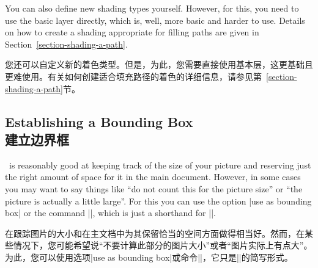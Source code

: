 You can also define new shading types yourself. However, for this, you need to
use the basic layer directly, which is, well, more basic and harder to use.
Details on how to create a shading appropriate for filling paths are given in
Section~\ref{section-shading-a-path}.

您还可以自定义新的着色类型。但是，为此，您需要直接使用基本层，这更基础且更难使用。有关如何创建适合填充路径的着色的详细信息，请参见第~\ref{section-shading-a-path}节。



\subsection{Establishing a Bounding Box\\建立边界框}

\pgfname\ is reasonably good at keeping track of the size of your picture and
reserving just the right amount of space for it in the main document. However,
in some cases you may want to say things like ``do not count this for the
picture size'' or ``the picture is actually a little large''. For this you can
use the option |use as bounding box| or the command |\useasboundingbox|, which
is just a shorthand for ||.

\pgfname 在跟踪图片的大小和在主文档中为其保留恰当的空间方面做得相当好。然而，在某些情况下，您可能希望说“不要计算此部分的图片大小”或者“图片实际上有点大”。为此，您可以使用选项|use as bounding box|或命令|\useasboundingbox|，它只是||的简写形式。

